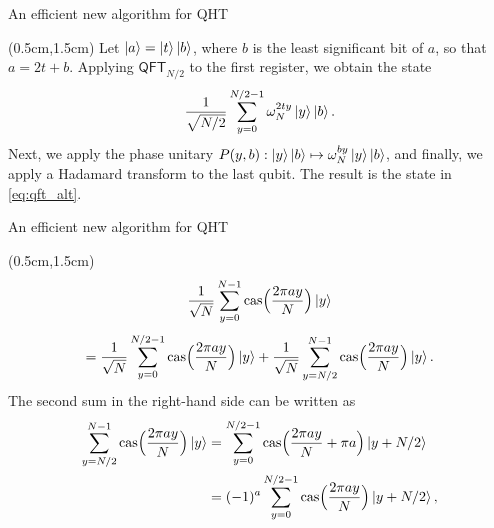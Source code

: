 \documentclass{beamer}
\theoremstyle{definition}
\newcommand{\cas}{\mathrm{cas}}
\newcommand{\qft}{\mathsf{QFT}}
\begin{document}
\begin{frame}{An efficient new algorithm for QHT}
    
    \begin{textblock*}{12cm}(0.5cm,1.5cm)
        Let $\ket{a} = \ket{t}\ket{b}$, where $b$ is the least significant bit of $a$, so that $a = 2t + b$. Applying $\qft_{N / 2}$ to the first register, we obtain the state
        \[ \frac{1}{\sqrt{N / 2}} \sum_{y = 0}^{N / 2 - 1} \omega_N^{2ty} \ket{y} \ket{b}. \]
        Next, we apply the phase unitary $P(y, b): \ket{y} \ket{b} \mapsto \omega_N^{by} \ket{y} \ket{b}$, and finally, we apply a Hadamard transform to the last qubit. The result is the state in \eqref{eq:qft_alt}.  

    \end{textblock*}
    

\end{frame}



\begin{frame}{An efficient new algorithm for QHT}
    
    \begin{textblock*}{12cm}(0.5cm,1.5cm)
        \begin{equation}
            \frac{1}{\sqrt{N}} \sum_{y = 0}^{N - 1} \cas\Big( \frac{2\pi a y}{N} \Big) \ket{y}  
        \end{equation}
        \begin{equation}
            = \frac{1}{\sqrt{N}} \sum_{y = 0}^{N / 2 - 1} \cas\Big( \frac{2\pi a y}{N} \Big) \ket{y} +  \frac{1}{\sqrt{N}} \sum_{y = N / 2}^{N - 1} \cas\Big( \frac{2\pi a y}{N} \Big) \ket{y}.
        \end{equation}
        The second sum in the right-hand side can be written as 
        \begin{align*}
            \sum_{y = N / 2}^{N - 1} \cas\Big( \frac{2\pi a y}{N} \Big) \ket{y}
            & = \sum_{y = 0}^{N / 2 - 1} \cas\Big( \frac{2\pi a y}{N} + \pi a \Big) \ket{y + N/2} \\
            & = (-1)^a \sum_{y = 0}^{N / 2 - 1} \cas\Big( \frac{2\pi a y}{N} \Big) \ket{y + N/2},
        \end{align*}
    \end{textblock*}

\end{frame}
\end{document}
